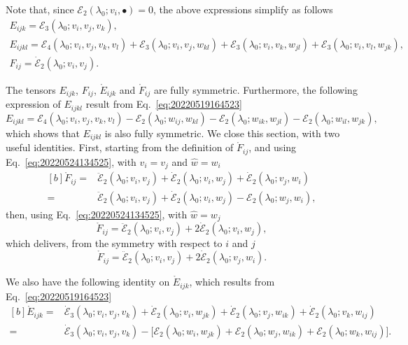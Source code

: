 \documentclass[12pt, final]{scrartcl}
\theoremstyle{definition}
\newcommand{\E}{\mathcal E}
\begin{document}
Note that, since $\E_2(\lambda_0; v_i, \bullet) = 0$, the above expressions simplify as follows
\begin{gather}
  \label{eq:20220524135619}
  E_{ijk} = \E_3(\lambda_0; v_i, v_j, v_k),\\
  \label{eq:20220524135553}
  E_{ijkl} = \E_4(\lambda_0 ; v_i, v_j, v_k, v_l) + \E_3(\lambda_0 ; v_i, v_j, w_{kl}) + \E_3(\lambda_0 ; v_i, v_k, w_{jl}) + \E_3(\lambda_0 ; v_i, v_l, w_{jk}),\\
  \label{eq:20220524135643}
  F_{ij} = \dot{\E}_2(\lambda_0; v_i, v_j).
\end{gather}

The tensors $E_{ijk}$, $F_{ij}$, $\mathring{E}_{ijk}$ and $\mathring{F}_{ij}$ are fully symmetric. Furthermore, the
following expression of $E_{ijkl}$ result from Eq.~\eqref{eq:20220519164523}
\begin{equation}
  \label{eq:20220802081116}
  E_{ijkl} = \E_4(\lambda_0 ; v_i, v_j, v_k, v_l) - \E_2(\lambda_0 ; w_{ij}, w_{kl}) - \E_2(\lambda_0 ; w_{ik}, w_{jl}) - \E_2(\lambda_0 ; w_{il}, w_{jk}),
\end{equation}
which shows that $E_{ijkl}$ is also fully symmetric. We close this section, with two useful identities. First, starting
from the definition of $\mathring{F}_{ij}$, and using Eq.~\eqref{eq:20220524134525}, with $v_i = v_j$ and
$\hat{w} = w_i$
\begin{equation}
  \label{eq:20220617084433}
  \begin{aligned}[b]
    \mathring{F}_{ij} ={} & \ddot{\E}_2(\lambda_0; v_i, v_j) + \dot{\E}_2(\lambda_0; v_i, w_j) + \dot{\E}_2(\lambda_0; v_j, w_i)\\
    ={} & \ddot{\E}_2(\lambda_0; v_i, v_j) + \dot{\E}_2(\lambda_0; v_i, w_j) - \E_2(\lambda_0; w_j, w_i),
  \end{aligned}
\end{equation}
then, using Eq.~\eqref{eq:20220524134525}, with $\hat{w} = w_j$
\begin{equation}
  \mathring{F}_{ij} = \ddot{\E}_2(\lambda_0; v_i, v_j)  + 2\dot{\E}_2(\lambda_0; v_i, w_j),
\end{equation}
which delivers, from the symmetry with respect to $i$ and $j$
\begin{equation}
  \mathring{F}_{ij} = \ddot{\E}_2(\lambda_0; v_i, v_j) + 2\dot{\E}_2(\lambda_0; v_j, w_i).
\end{equation}

We also have the following identity on $\mathring{E}_{ijk}$, which results from Eq.~\eqref{eq:20220519164523}
\begin{equation}
  \label{eq:20220617085256}
  \begin{aligned}[b]
  \mathring{E}_{ijk} ={}& \dot{\E}_3(\lambda_0; v_i, v_j, v_k) + \dot{\E}_2(\lambda_0; v_i, w_{jk}) + \dot{\E}_2(\lambda_0; v_j, w_{ik}) + \dot{\E}_2(\lambda_0; v_k, w_{ij})\\
  ={}& \dot{\E}_3(\lambda_0; v_i, v_j, v_k) - \bigl[\E_2(\lambda_0; w_i, w_{jk}) + \E_2(\lambda_0; w_j, w_{ik}) + \E_2(\lambda_0; w_k, w_{ij})\bigr].
  \end{aligned}
\end{equation}
\end{document}

